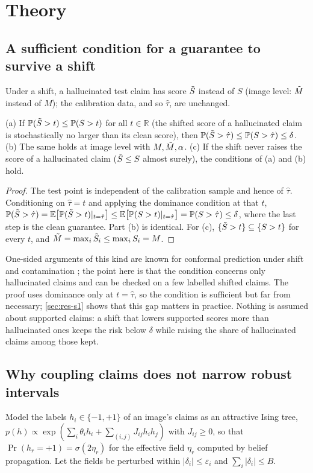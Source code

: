 \section{Theory}\label{sec:theory}

\subsection{A sufficient condition for a guarantee to survive a shift}
Under a shift, a hallucinated test claim has score $\tilde S$ instead of $S$ (image level: $\tilde M$ instead of $M$); the calibration data, and so $\hat\tau$, are unchanged.

\begin{proposition}[P1]\label{prop:p1}
(a) If $\mathbb{P}(\tilde S>t)\le\mathbb{P}(S>t)$ for all $t\in\mathbb{R}$ (the shifted score of a hallucinated claim is stochastically no larger than its clean score), then $\mathbb{P}(\tilde S>\hat\tau)\le\mathbb{P}(S>\hat\tau)\le\delta$.
(b) The same holds at image level with $M,\tilde M,\alpha$.
(c) If the shift never raises the score of a hallucinated claim ($\tilde S\le S$ almost surely), the conditions of (a) and (b) hold.
\end{proposition}
\begin{proof}
The test point is independent of the calibration sample and hence of $\hat\tau$. Conditioning on $\hat\tau=t$ and applying the dominance condition at that $t$,
$\mathbb{P}(\tilde S>\hat\tau)=\mathbb{E}\big[\mathbb{P}(\tilde S>t)|_{t=\hat\tau}\big]\le\mathbb{E}\big[\mathbb{P}(S>t)|_{t=\hat\tau}\big]=\mathbb{P}(S>\hat\tau)\le\delta$, where the last step is the clean guarantee. Part (b) is identical. For (c), $\{\tilde S>t\}\subseteq\{S>t\}$ for every $t$, and $\tilde M=\max_i\tilde S_i\le\max_i S_i=M$.
\end{proof}

\begin{remark}
One-sided arguments of this kind are known for conformal prediction under shift and contamination \citep{doula2026conformal,clarkson2024split}; the point here is that the condition concerns only hallucinated claims and can be checked on a few labelled shifted claims. The proof uses dominance only at $t=\hat\tau$, so the condition is sufficient but far from necessary; \cref{sec:res-s1} shows that this gap matters in practice. Nothing is assumed about supported claims: a shift that lowers supported scores more than hallucinated ones keeps the risk below $\delta$ while raising the share of hallucinated claims among those kept.
\end{remark}

\subsection{Why coupling claims does not narrow robust intervals}
Model the labels $h_i\in\{-1,+1\}$ of an image's claims as an attractive Ising tree, $p(h)\propto\exp(\sum_i\theta_ih_i+\sum_{(i,j)}J_{ij}h_ih_j)$ with $J_{ij}\ge0$, so that $\Pr(h_r=+1)=\sigma(2\eta_r)$ for the effective field $\eta_r$ computed by belief propagation. Let the fields be perturbed within $|\delta_i|\le\varepsilon_i$ and $\sum_i|\delta_i|\le B$.

